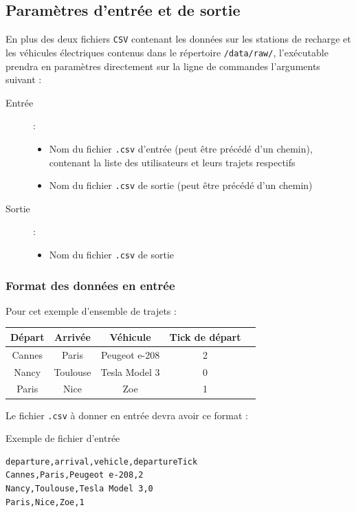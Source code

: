 \documentclass[a4paper, 12pt]{report}
\begin{document}
\clearpage

\subsection{Paramètres d'entrée et de sortie}
En plus des deux fichiers \texttt{CSV} contenant les données sur les stations de recharge et les véhicules électriques contenus dans le répertoire \texttt{/data/raw/}, l'exécutable prendra en paramètres directement sur la ligne de commandes l'arguments suivant :\par\bigskip
\begin{description}
    \item[Entrée] :
        \begin{itemize}
            \item Nom du fichier \texttt{.csv} d'entrée (peut être précédé d'un chemin), contenant la liste des utilisateurs et leurs trajets respectifs
            \item Nom du fichier \texttt{.csv} de sortie (peut être précédé d'un chemin)
        \end{itemize}
    \item[Sortie] :
        \begin{itemize}
            \item Nom du fichier \texttt{.csv} de sortie
        \end{itemize}
\end{description}
\subsubsection{Format des données en entrée}
Pour cet exemple d'ensemble de trajets :\par\bigskip
\begin{table}[htbp]
    \centering\begin{tabular}{|c|c|c|c|c|}
        \hline
        Départ & Arrivée & Véhicule & Tick de départ \\
        \hline\hline
        Cannes & Paris & Peugeot e-208 & 2 \\
        \hline
        Nancy & Toulouse & Tesla Model 3 & 0 \\
        \hline
        Paris & Nice & Zoe & 1 \\
        \hline
        \end{tabular}
\end{table}
Le fichier \texttt{.csv} à donner en entrée devra avoir ce format :\par\bigskip
\begin{longlisting}
    \caption{Exemple de fichier d'entrée}
    \begin{verbatim}
departure,arrival,vehicle,departureTick
Cannes,Paris,Peugeot e-208,2
Nancy,Toulouse,Tesla Model 3,0
Paris,Nice,Zoe,1
    \end{verbatim}
\end{longlisting}
\end{document}
